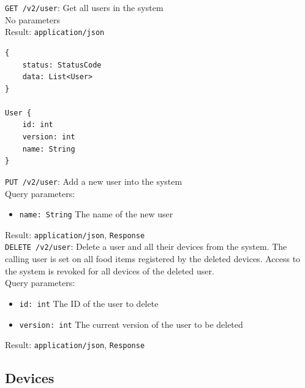 \documentclass[12pt]{report}
\begin{document}
\texttt{GET /v2/user}: Get all users in the system\\
No parameters\\
Result: \texttt{application/json}
\begin{lstlisting}
{
    status: StatusCode
    data: List<User>
}

User {
    id: int
    version: int
    name: String
}
\end{lstlisting}\vspace{7mm}
\texttt{PUT /v2/user}: Add a new user into the system\\
Query parameters:
\begin{itemize}
\item \texttt{name: String} The name of the new user
\end{itemize}
Result: \texttt{application/json}, \texttt{Response}\vspace{7mm}\\
\texttt{DELETE /v2/user}: Delete a user and all their devices from the system.
The calling user is set on all food items registered by the deleted devices.
Access to the system is revoked for all devices of the deleted user.\\
Query parameters:
\begin{itemize}
\item \texttt{id: int} The ID of the user to delete
\item \texttt{version: int} The current version of the user to be deleted
\end{itemize}
Result: \texttt{application/json}, \texttt{Response}

\subsection{Devices}
\end{document}
